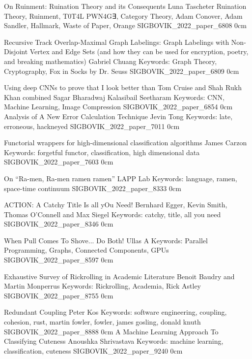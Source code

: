 \addpaper
    {On Ruinment: Ruination Theory and its Consequents}
    {Luna Tascheter}
    {Ruination Theory, Ruinment, T0T4L PWN4G∃, Category Theory, Adam Conover, Adam Sandler, Hallmark, Waste of Paper, Orange}
    {SIGBOVIK_2022_paper_6808}
    {0cm}
    {}

\addtrack
    {}{Recursive Track}
\addpaper
    {Overlap-Maximal Graph Labelings: Graph Labelings with Non-Disjoint Vertex and Edge Sets (and how they can be used for encryption, poetry, and breaking mathematics)}
    {Gabriel Chuang}
    {Keywords: Graph Theory, Cryptography, Fox in Socks by Dr. Seuss}
    {SIGBOVIK_2022_paper_6809}
    {0cm}
    {}

\addpaper
    {Using deep CNNs to prove that I look better than Tom Cruise and Shah Rukh Khan combined}
    {Sagar Bharadwaj Kalasibail Seetharam}
    {Keywords: CNN, Machine Learning, Image Compression}
    {SIGBOVIK_2022_paper_6854}
    {0cm}
    {}
\addpaper
    {Analysis of A New Error Calculation Technique}
    {Jevin Tong} 
    {Keywords: late, erroneous, hackneyed}
    {SIGBOVIK_2022_paper_7011}
    {0cm}
    {}

\addpaper
    {Functorial wrappers for high-dimensional classification algorithms}
    {James Carzon}
    {Keywords: forgetful functor, classification, high dimensional data}
    {SIGBOVIK_2022_paper_7603}
    {0cm}
    {}

\addpaper
    {On ``Ra-men, Ra-men ramen ramen''}
    {LAPP Lab}
    {Keywords: language, ramen, space-time continuum}
    {SIGBOVIK_2022_paper_8333}
    {0cm}
    {}

\addpaper
    {ACTION: A Catchy Title Is all yOu Need!}
    {Bernhard Egger, Kevin Smith, Thomas O'Connell and Max Siegel}
    {Keywords: catchy, title, all you need}
    {SIGBOVIK_2022_paper_8346}
    {0cm}
    {}

\addpaper
    {When Pull Comes To Shove... Do Both!}
    {Ullas A}
    {Keywords: Parallel Programming, Graphs, Connected Components, GPUs}
    {SIGBOVIK_2022_paper_8597}
    {0cm}
    {}

\addpaper
    {Exhaustive Survey of Rickrolling in Academic Literature}
    {Benoit Baudry and Martin Monperrus}
    {Keywords: Rickrolling, Academia, Rick Astley}
    {SIGBOVIK_2022_paper_8755}
    {0cm}
    {}

\addpaper
    {Redundant Coupling}
    {Peter Kos}
    {Keywords: software engineering, coupling, cohesion, rust, martin fowler, fowler, james gosling, donald knuth}
    {SIGBOVIK_2022_paper_8888}
    {0cm}
    {}
\addpaper
    {A Machine Learning Approach To Classifying Cuteness}
    {Anoushka Shrivastava}
    {Keywords: machine learning, classification, cuteness}
    {SIGBOVIK_2022_paper_9240}
    {0cm}
    {}

